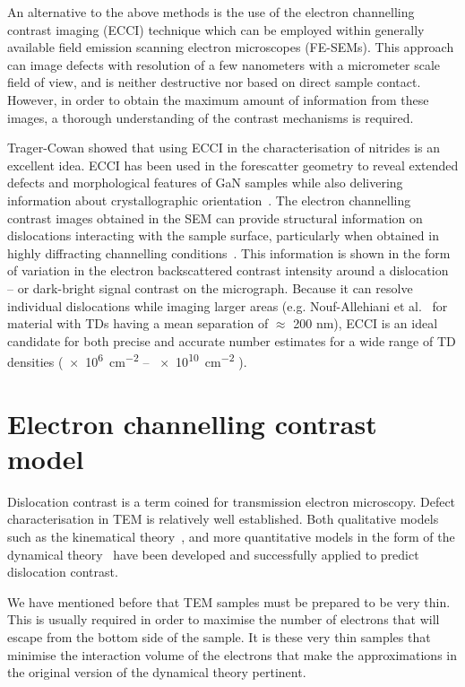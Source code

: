 An alternative to the above methods is the use of the electron  channelling contrast imaging (ECCI) technique which can be employed within generally available field emission scanning electron microscopes (FE-SEMs). This approach can image defects with resolution of a few nanometers with a micrometer scale field of view, and is neither destructive nor based on direct sample contact. However, in order to obtain the maximum amount of information from these images, a thorough understanding of the contrast mechanisms is required.

Trager-Cowan \etal\cite{Carol} showed that using ECCI in the characterisation of nitrides is an excellent idea. ECCI has been used in the forescatter geometry to reveal extended defects and
morphological features of GaN samples while also delivering information about crystallographic orientation~\cite{Picard}. The electron channelling contrast images obtained in the SEM can provide structural information on dislocations  interacting with the sample surface, particularly when obtained in highly diffracting channelling conditions~\cite{Naresh}. This information is shown in the form of variation in the electron backscattered contrast intensity around a dislocation -- or dark-bright signal contrast on the micrograph. Because it can resolve individual dislocations while imaging larger areas (e.g. Nouf-Allehiani et al.~\cite{Nouf} for material with TDs having a mean separation of $\approx$ 200 nm), ECCI is an ideal candidate for both precise and accurate number estimates for a wide range of TD densities (\SI{e6}{\centi \metre^{-2}} -- \SI{e10}{\centi \metre^{-2}} ).




 \section{Electron channelling contrast model}

Dislocation contrast is a term coined for transmission electron microscopy. Defect characterisation in TEM is relatively well established. Both qualitative models such as the kinematical theory~\cite{Hirsch60}, and more quantitative models in the form of the dynamical theory~\cite{Howie61,Clarke71,Spencer72} have been developed and successfully applied to predict dislocation contrast.

We have mentioned before that TEM samples must be prepared to be very thin. This is usually required in order to maximise the number of electrons that will escape from the bottom side of the sample. It is these very thin samples that minimise the interaction volume of the electrons that make the approximations in the original version of the dynamical theory pertinent. 

